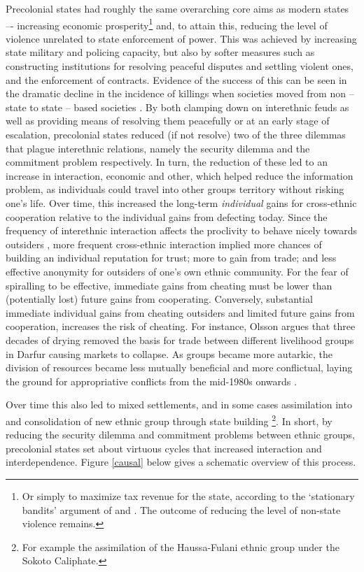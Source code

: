 \documentclass[12pt]{article}
\begin{document}
Precolonial states had roughly the same overarching core aims as modern states
–- increasing economic prosperity\footnote{Or simply to maximize tax revenue for
	the state, according to the `stationary bandits' argument of
	\citet{tilly_1985} and \citet{Olson1993}. The outcome of reducing the
level of non-state violence remains.} and, to attain this, reducing the level of
violence unrelated to state enforcement of power. This was achieved by
increasing state military and policing capacity, but also by softer measures
such as constructing institutions for resolving peaceful disputes and settling
violent ones, and the enforcement of contracts. Evidence of the success of this
can be seen in the dramatic decline in the incidence of killings when societies
moved from non -- state to state -- based societies \citep[64ff]{Pinker2012}. By
both clamping down on interethnic feuds as well as providing means of resolving
them peacefully or at an early stage of escalation, precolonial states reduced
(if not resolve) two of the three dilemmas that plague interethnic relations,
namely the security dilemma and the commitment problem respectively. In turn,
the reduction of these led to an increase in interaction, economic and other,
which helped reduce the information problem, as individuals could travel into
other groups territory without risking one’s life. Over time, this increased the
long-term \textit{individual} gains for cross-ethnic cooperation relative to the
individual gains from defecting today. Since the frequency of interethnic
interaction affects the proclivity to behave nicely towards outsiders
\citep[721]{Fearon_1996}, more frequent cross-ethnic interaction implied more
chances of building an individual reputation for trust; more to gain from trade;
and less effective anonymity for outsiders of one’s own ethnic community. For
the fear of spiralling to be effective, immediate gains from cheating must be
lower than (potentially lost) future gains from cooperating. Conversely,
substantial immediate individual gains from cheating outsiders and limited
future gains from cooperation, increases the risk of cheating. For instance,
Olsson argues that three decades of drying removed the basis for trade between
different livelihood groups in Darfur causing markets to collapse. As groups
became more autarkic, the division of resources became less mutually beneficial
and more conflictual, laying the ground for appropriative conflicts from the
mid-1980s onwards \citep{Olsson2016}. 

Over time this also led to mixed settlements,
and in some cases assimilation into and consolidation of new ethnic group
through state building \citep{Anderson2006}\footnote{For example the
assimilation of the Haussa-Fulani ethnic group under the Sokoto Caliphate.}. In
short, by reducing the security dilemma and commitment problems between ethnic
groups, precolonial states set about virtuous cycles that increased interaction
and interdependence. Figure \ref{causal} below gives a schematic overview of
this process.
\end{document}
